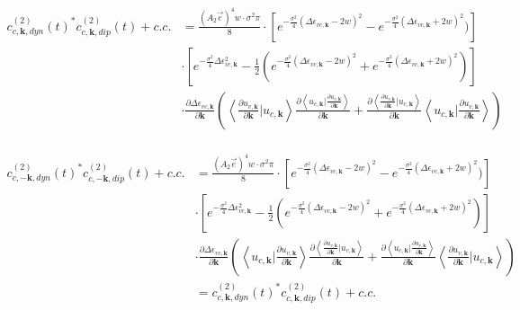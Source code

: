 \begin{equation}
\begin{aligned}
    c^{(2)}_{c,\mathbf k,dyn}(t)^* c^{(2)}_{c,\mathbf k,dip}(t)+c.c. &=\frac{(A_2 \vec e)^4 w \cdot \sigma^2 \pi}{8}  \cdot [e^{-\frac{\sigma^2}{4} (\Delta \epsilon_{vc,\mathbf k}-2w)^2}-e^{-\frac{\sigma^2}{4} (\Delta \epsilon_{vc,\mathbf k}+2w)^2})]\\
    &\cdot [e^{-\frac{\sigma^2}{4} \Delta \epsilon_{vc,\mathbf k} ^2}-\frac{1}{2}(e^{-\frac{\sigma^2}{4} (\Delta \epsilon_{vc,\mathbf k}-2w)^2}+e^{-\frac{\sigma^2}{4} (\Delta \epsilon_{vc,\mathbf k}+2w)^2})]\\
   & \cdot \frac{\partial  \Delta \epsilon_{vc,\mathbf k}}{\partial \mathbf k} 
   (\left \langle \frac{\partial u_{v,\mathbf k}}{\partial \mathbf k} |  u_{c,\mathbf k} \right \rangle \frac{\partial{\left \langle u_{c,\mathbf k}\Big |\frac{\partial u_{v,\mathbf k}}{\partial \mathbf k} \right \rangle}}{\partial {\mathbf k}}+
   \frac{\partial{\left \langle \frac{\partial u_{v,\mathbf k}}{\partial \mathbf k} \Big |u_{c,\mathbf k} \right \rangle}}{\partial {\mathbf k}} 
    \left \langle  u_{c,\mathbf k}| \frac{\partial u_{v,\mathbf k}}{\partial \mathbf k} \right \rangle )\\
\end{aligned}
\end{equation}

\begin{equation}
\begin{aligned}
    c^{(2)}_{c,-\mathbf k,dyn}(t)^* c^{(2)}_{c,-\mathbf k,dip}(t)+c.c. &=\frac{(A_2 \vec e)^4 w \cdot \sigma^2 \pi}{8}  \cdot [e^{-\frac{\sigma^2}{4} (\Delta \epsilon_{vc,\mathbf k}-2w)^2}-e^{-\frac{\sigma^2}{4} (\Delta \epsilon_{vc,\mathbf k}+2w)^2})]\\
    &\cdot [e^{-\frac{\sigma^2}{4} \Delta \epsilon_{vc,\mathbf k} ^2}-\frac{1}{2}(e^{-\frac{\sigma^2}{4} (\Delta \epsilon_{vc,\mathbf k}-2w)^2}+e^{-\frac{\sigma^2}{4} (\Delta \epsilon_{vc,\mathbf k}+2w)^2})]\\
   & \cdot \frac{\partial  \Delta \epsilon_{vc,\mathbf k}}{\partial \mathbf k} 
   (\left \langle u_{c,\mathbf k} \big | \frac{\partial u_{v,\mathbf k}}{\partial \mathbf k}  \right \rangle \frac{\partial{\left \langle\frac{\partial u_{v,\mathbf k}}{\partial \mathbf k}\Big |u_{c,\mathbf k}\right \rangle}}{\partial {\mathbf k}} +
   \frac{\partial{\left \langle u_{c,\mathbf k}\Big |\frac{\partial u_{v,\mathbf k}}{\partial \mathbf k} \right \rangle}}{\partial {\mathbf k}}
    \left \langle \frac{\partial u_{v,\mathbf k}}{\partial \mathbf k} |  u_{c,\mathbf k} \right \rangle)\\
   &=c^{(2)}_{c,\mathbf k,dyn}(t)^* c^{(2)}_{c,\mathbf k,dip}(t)+c.c.
\end{aligned}
\end{equation}

